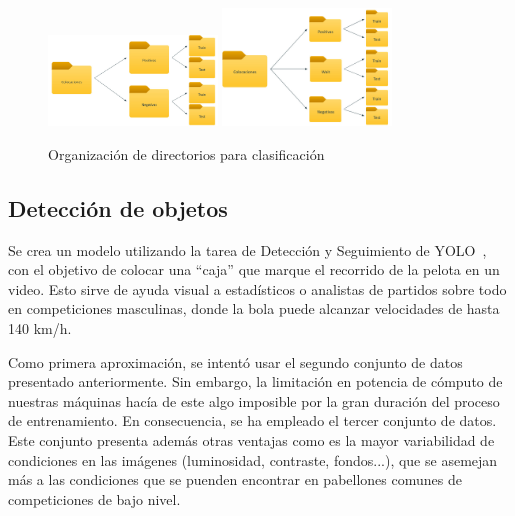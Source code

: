 \documentclass[12pt]{report} %
\begin{document}
    \begin{figure}[H]
        \includegraphics[width=0.4\textwidth]{folders_binario.jpeg}
        \hspace{0.3cm}
        \includegraphics[width=0.4\textwidth]{folders_ternario.jpg}
        \caption {Organización de directorios para clasificación}
    \end{figure}

    
    \subsection{Detección de objetos}
    Se crea un modelo utilizando la tarea de Detección y Seguimiento de YOLO~\cite{YOLODetect}, con el objetivo de colocar una ``caja'' que marque el recorrido de la pelota en un video. Esto sirve de ayuda visual a estadísticos o analistas de partidos sobre todo en competiciones masculinas, donde la bola puede alcanzar velocidades de hasta 140 km/h. 

    Como primera aproximación, se intentó usar el segundo conjunto de datos presentado anteriormente. Sin embargo, la limitación en potencia de cómputo de nuestras máquinas hacía de este algo imposible por la gran duración del proceso de entrenamiento. En consecuencia, se ha empleado el tercer conjunto de datos. Este conjunto presenta además otras ventajas como es la mayor variabilidad de condiciones en las imágenes (luminosidad, contraste, fondos...), que se asemejan más a las condiciones que se puenden encontrar en pabellones comunes de competiciones de bajo nivel.
\end{document}
